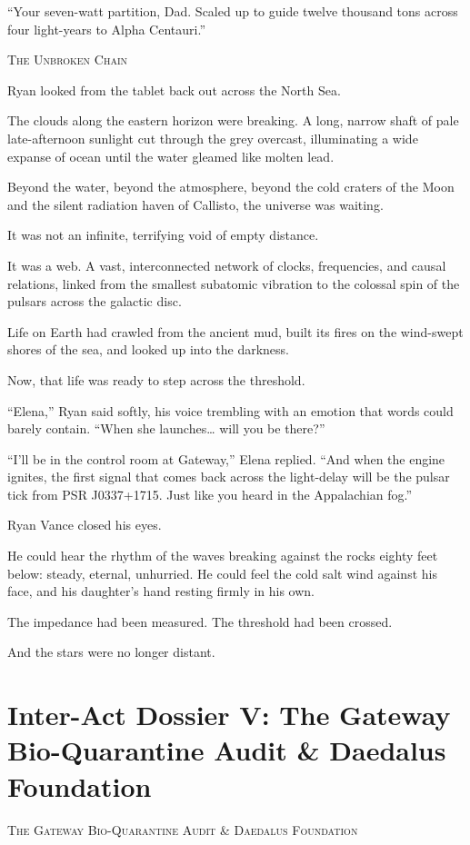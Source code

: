 \documentclass[12pt,twoside,openright]{book}
\newcommand{\sceneheader}[1]{%
  \par\vspace{1.8em}%
  {\noindent\centering\scshape\large #1\par}%
  \vspace{1.0em}%
  \noindent%
}
\newcommand{\dinkus}{%
  \par\vspace{1.2em}%
  {\noindent\centering{\large $\ast\quad\ast\quad\ast$}\par}%
  \vspace{1.2em}%
  \noindent%
}
\begin{document}
``Your seven-watt partition, Dad. Scaled up to guide twelve thousand
tons across four light-years to Alpha Centauri.''

\dinkus

\sceneheader{The Unbroken Chain}

Ryan looked from the tablet back out across the North Sea.

The clouds along the eastern horizon were breaking. A long, narrow shaft
of pale late-afternoon sunlight cut through the grey overcast,
illuminating a wide expanse of ocean until the water gleamed like molten
lead.

Beyond the water, beyond the atmosphere, beyond the cold craters of the
Moon and the silent radiation haven of Callisto, the universe was
waiting.

It was not an infinite, terrifying void of empty distance.

It was a web. A vast, interconnected network of clocks, frequencies, and
causal relations, linked from the smallest subatomic vibration to the
colossal spin of the pulsars across the galactic disc.

Life on Earth had crawled from the ancient mud, built its fires on the
wind-swept shores of the sea, and looked up into the darkness.

Now, that life was ready to step across the threshold.

``Elena,'' Ryan said softly, his voice trembling with an emotion that
words could barely contain. ``When she launches\ldots{} will you be
there?''

``I'll be in the control room at Gateway,'' Elena replied. ``And when
the engine ignites, the first signal that comes back across the
light-delay will be the pulsar tick from PSR J0337+1715. Just like you
heard in the Appalachian fog.''

Ryan Vance closed his eyes.

He could hear the rhythm of the waves breaking against the rocks eighty
feet below: steady, eternal, unhurried. He could feel the cold salt wind
against his face, and his daughter's hand resting firmly in his own.

The impedance had been measured. The threshold had been crossed.

And the stars were no longer distant.

\cleardoublepage
\chapter*{Inter-Act Dossier V: The Gateway Bio-Quarantine Audit \& Daedalus Foundation}
\sceneheader{The Gateway Bio-Quarantine Audit \& Daedalus
Foundation}
\end{document}
